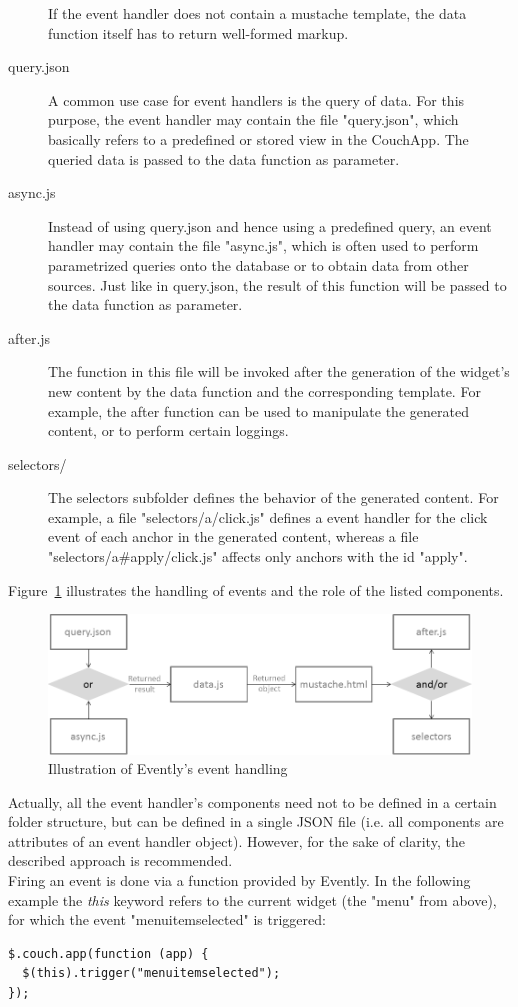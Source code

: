 \begin{description}
If the event handler does not contain a mustache template, the data function itself has to return well-formed markup.
\item[query.json] A common use case for event handlers is the query of data. For this purpose, the event handler may contain the file "query.json", which basically refers to a predefined or stored view in the CouchApp. The queried data is passed to the data function as parameter.
\item[async.js] Instead of using query.json and hence using a predefined query, an event handler may contain the file "async.js", which is often used to perform parametrized queries onto the database or to obtain data from other sources. Just like in query.json, the result of this function will be passed to the data function as parameter.
\item[after.js] The function in this file will be invoked after the generation of the widget's new content by the data function and the corresponding template. For example, the after function can be used to manipulate the generated content, or to perform certain loggings.
\item[selectors/] The selectors subfolder defines the behavior of the generated content. For example, a file "selectors/a/click.js" defines a event handler for the click event of each anchor in the generated content, whereas a file "selectors/a\#apply/click.js" affects only anchors with the id "apply".
\end{description}
Figure~\ref{img:eventlyeventhandler} illustrates the handling of events and the role of the listed components.\\
\begin{figure}[h!]
\centering
\includegraphics[width=1.00\columnwidth]{images/eventlyeventhandler.png}
\caption{Illustration of Evently's event handling}
\label{img:eventlyeventhandler}
\end{figure}
Actually, all the event handler's components need not to be defined in a certain folder structure, but can be defined in a single JSON file (i.e. all components are attributes of an event handler object). However, for the sake of clarity, the described approach is recommended.\\
Firing an event is done via a function provided by Evently. In the following example the \emph{this} keyword refers to the current widget (the "menu" from above), for which the event "menuitemselected" is triggered:
\begin{lstlisting}
$.couch.app(function (app) {
  $(this).trigger("menuitemselected");
});
\end{lstlisting}

